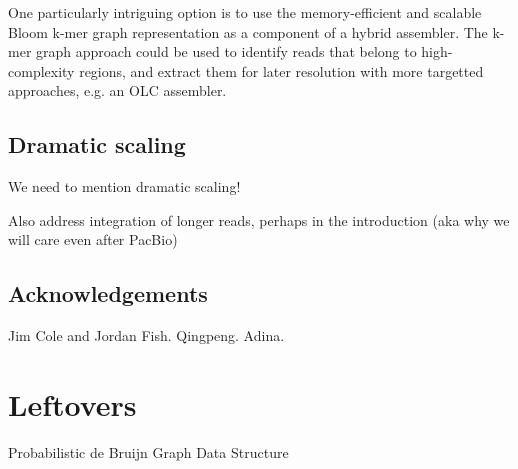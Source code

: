 \documentclass[12pt]{article} \usepackage{simplemargins}
\begin{document}
One particularly intriguing option is to use the memory-efficient and
scalable Bloom k-mer graph representation as a component of a hybrid
assembler.  The k-mer graph approach could be used to identify
reads that belong to high-complexity regions, and extract them for
later resolution with more targetted approaches, e.g. an OLC assembler.

\subsection{Dramatic scaling}

We need to mention dramatic scaling!

Also address integration of longer reads, perhaps in the introduction
(aka why we will care even after PacBio)

\subsection{Acknowledgements}

Jim Cole and Jordan Fish.  Qingpeng.  Adina.




\newpage

\section{Leftovers}

Probabilistic de Bruijn Graph Data Structure
\end{document}
